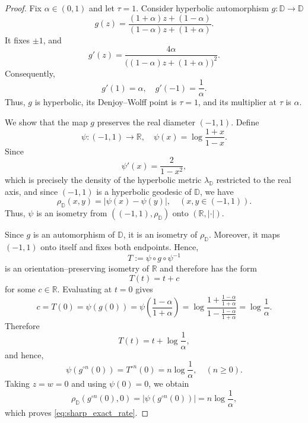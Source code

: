 \documentclass[10pt,a4paper]{amsart}
\numberwithin{equation}{section}
\begin{document}
\begin{proof}
Fix $\alpha\in(0,1)$ and let $\tau=1$. Consider hyperbolic
automorphism $g:\mathbb{D}\to \mathbb{D}$
\begin{equation}
\label{eq:sharpness_automorphism}
g(z)
=
\frac{(1+\alpha)z+(1-\alpha)}
     {(1-\alpha)z+(1+\alpha)}.
\end{equation}
It fixes $\pm1$, and
\begin{equation*}
g'(z)
=
\frac{4\alpha}
{\bigl((1-\alpha)z+(1+\alpha)\bigr)^2}.
\end{equation*}
Consequently,
\begin{equation*}
g'(1)=\alpha,
\quad
g'(-1)=\frac{1}{\alpha}.
\end{equation*}
Thus, $g$ is hyperbolic, its Denjoy--Wolff point is $\tau=1$, and its
multiplier at $\tau$ is $\alpha$.

We show that the map $g$ preserves the real diameter $(-1,1)$. Define
\begin{equation*}
\psi:(-1,1)\to\mathbb{R},
\quad
\psi(x)=\log\frac{1+x}{1-x}.
\end{equation*}
Since
\begin{equation*}
\psi'(x)=\frac{2}{1-x^2},
\end{equation*}
which is precisely the density of the hyperbolic metric
$\lambda_{\mathbb{D}}$ restricted to the real axis, and since
$(-1,1)$ is a hyperbolic geodesic of $\mathbb{D}$, we have
\begin{equation*}
\rho_{\mathbb{D}}(x,y)
=
|\psi(x)-\psi(y)|,
\quad (x,y\in(-1,1)).
\end{equation*}
Thus, $\psi$ is an isometry from
$((-1,1),\rho_{\mathbb{D}})$ onto $(\mathbb{R},|\cdot|)$.

Since $g$ is an automorphism of $\mathbb{D}$, it is an isometry of
$\rho_{\mathbb{D}}$. Moreover, it maps $(-1,1)$ onto itself and fixes
both endpoints. Hence,
\begin{equation*}
T:=\psi\circ g\circ\psi^{-1}
\end{equation*}
is an orientation--preserving isometry of $\mathbb{R}$ and therefore
has the form
\begin{equation*}
T(t)=t+c
\end{equation*}
for some $c\in\mathbb{R}$. Evaluating at $t=0$ gives
\begin{equation*}
c
=T(0)
=\psi(g(0))
=\psi\left(\frac{1-\alpha}{1+\alpha}\right)
=
\log
\frac{
1+\frac{1-\alpha}{1+\alpha}
}{
1-\frac{1-\alpha}{1+\alpha}
}
=
\log\frac{1}{\alpha}.
\end{equation*}
Therefore
\begin{equation*}
T(t)=t+\log\frac{1}{\alpha},
\end{equation*}
and hence,
\begin{equation*}
\psi(g^{\circ n}(0))
=
T^{\circ n}(0)
=
n\log\frac{1}{\alpha},
\quad(n\geq0).
\end{equation*}
Taking $z=w=0$ and using $\psi(0)=0$, we obtain
\begin{equation*}
\rho_{\mathbb{D}}(g^{\circ n}(0),0)
=
\left|\psi(g^{\circ n}(0))\right|
=
n\log\frac{1}{\alpha},
\end{equation*}
which proves \eqref{eq:sharp_exact_rate}.


\end{proof}
\end{document}
